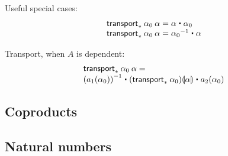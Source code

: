Useful special cases:
\[
\begin{array}{l}
\transport{x:A \mapsto \id[A] {a}{x}} {\alpha_0} \: {\alpha} = \alpha \ct \alpha_0 \\
\transport{x:A \mapsto \id[A] {x_0}{a}} {\alpha_0} \: {\alpha} = \opp {\alpha_0} \ct \alpha \\
\end{array}
\]

Transport, when $A$ is dependent:
\[
\begin{array}{l}
\transport{x_0:A_0 \mapsto \id[A(x_0)] {a_1(x_0)}{a_2(x_0)}} {\alpha_0} \: {\alpha} = \\
\opp{(\map{a_1}{\alpha_0})} \ct \mapdep{(\transport{A}{\alpha_0})}{\alpha} \ct \map{a_2}{\alpha_0}
\end{array}
\]

\subsection{Coproducts}
\label{sec:compute-coprod}

\subsection{Natural numbers}
\label{sec:compute-nat}








